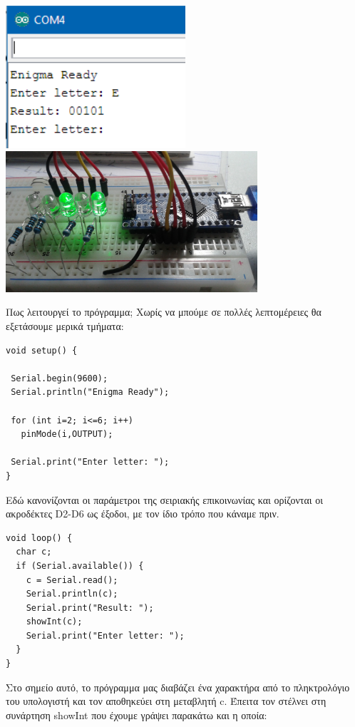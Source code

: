 \documentclass[a4paper,twoside,12pt]{article}
\begin{document}
\begin{center}
  \includegraphics[width=0.5\textwidth]{images/main/letter-e}
  \includegraphics[width=0.7\textwidth]{images/main/letter-e-leds}
\end{center}


Πως λειτουργεί το πρόγραμμα; Χωρίς να μπούμε σε πολλές λεπτομέρειες θα εξετάσουμε μερικά τμήματα:

\begin{verbatim}
void setup() { 

 Serial.begin(9600);
 Serial.println("Enigma Ready"); 
    
 for (int i=2; i<=6; i++)
   pinMode(i,OUTPUT);
 
 Serial.print("Enter letter: ");
}
\end{verbatim}

Εδώ κανονίζονται οι παράμετροι της σειριακής επικοινωνίας και ορίζονται οι ακροδέκτες D2-D6 ως έξοδοι, με τον ίδιο τρόπο που κάναμε πριν.

\begin{verbatim}
void loop() {
  char c;
  if (Serial.available()) {
    c = Serial.read();
    Serial.println(c); 
    Serial.print("Result: ");    
    showInt(c);
    Serial.print("Enter letter: ");
  }
}
\end{verbatim}

Στο σημείο αυτό, το πρόγραμμα μας διαβάζει ένα χαρακτήρα από το πληκτρολόγιο του υπολογιστή και τον αποθηκεύει στη μεταβλητή c. Έπειτα τον στέλνει στη συνάρτηση showInt που έχουμε γράψει παρακάτω και η οποία:
\end{document}
